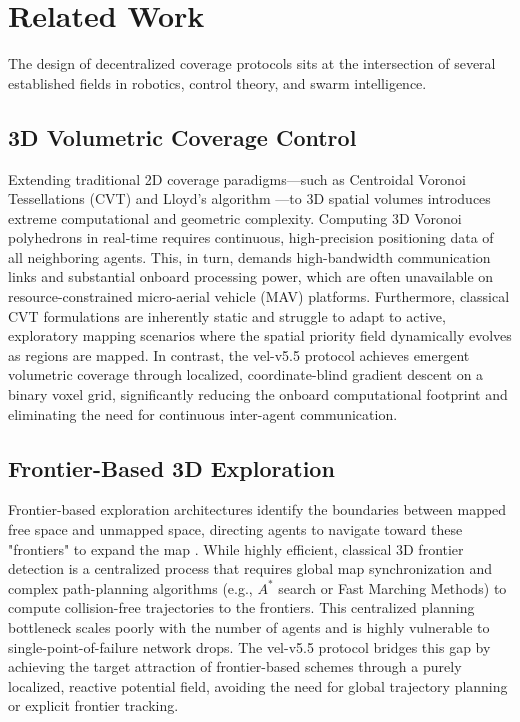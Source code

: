 \documentclass[letterpaper, 10pt, conference]{IEEEtran}
\begin{document}
\section{Related Work}
\label{sec:related}

The design of decentralized coverage protocols sits at the intersection of several established fields in robotics, control theory, and swarm intelligence.

\subsection{3D Volumetric Coverage Control}
Extending traditional 2D coverage paradigms—such as Centroidal Voronoi Tessellations (CVT) and Lloyd's algorithm \cite{lloyd1982, cortes2004}—to 3D spatial volumes introduces extreme computational and geometric complexity. Computing 3D Voronoi polyhedrons in real-time requires continuous, high-precision positioning data of all neighboring agents. This, in turn, demands high-bandwidth communication links and substantial onboard processing power, which are often unavailable on resource-constrained micro-aerial vehicle (MAV) platforms. Furthermore, classical CVT formulations are inherently static and struggle to adapt to active, exploratory mapping scenarios where the spatial priority field dynamically evolves as regions are mapped. In contrast, the vel-v5.5 protocol achieves emergent volumetric coverage through localized, coordinate-blind gradient descent on a binary voxel grid, significantly reducing the onboard computational footprint and eliminating the need for continuous inter-agent communication.

\subsection{Frontier-Based 3D Exploration}
Frontier-based exploration architectures identify the boundaries between mapped free space and unmapped space, directing agents to navigate toward these "frontiers" to expand the map \cite{yamauchi1997}. While highly efficient, classical 3D frontier detection is a centralized process that requires global map synchronization and complex path-planning algorithms (e.g., $A^*$ search or Fast Marching Methods) to compute collision-free trajectories to the frontiers. This centralized planning bottleneck scales poorly with the number of agents and is highly vulnerable to single-point-of-failure network drops. The vel-v5.5 protocol bridges this gap by achieving the target attraction of frontier-based schemes through a purely localized, reactive potential field, avoiding the need for global trajectory planning or explicit frontier tracking.
\end{document}

